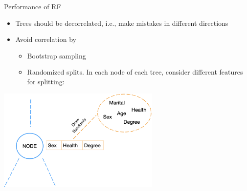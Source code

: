 \documentclass[11pt,compress,t,notes=noshow, xcolor=table]{beamer}
\begin{document}
\begin{vbframe}{Performance of RF}
\begin{itemize} 
\item \small Trees should be decorrelated, i.e., make mistakes in different directions
\item \small Avoid correlation by
    \begin{itemize}
        \item \small Bootstrap sampling 
        \item \small Randomized splits. In each node of each tree, consider different features for splitting:
    \end{itemize}
\end{itemize}

\vspace{0.5cm}
\begin{center}
  \includegraphics[width = 0.6\textwidth]{slides/forests/figure_man/nutshell-randomforest-random-split.png}
\end{center}




\end{vbframe}

\end{document}
